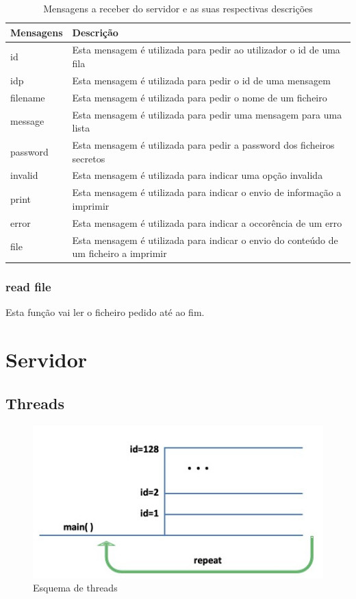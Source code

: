 \documentclass{article}
\begin{document}
\begin{table}[htbp]
\caption{\label{tab:messages}
Mensagens a receber do servidor e as suas respectivas descrições}
\centering
\begin{tabular}{ll}
\hline
Mensagens & Descrição\\
\hline
id & Esta mensagem é utilizada para pedir ao utilizador o id de uma fila\\
idp & Esta mensagem é utilizada para pedir o id de uma mensagem\\
filename & Esta mensagem é utilizada para pedir o nome de um ficheiro\\
message & Esta mensagem é utilizada para pedir uma mensagem para uma lista\\
password & Esta mensagem é utilizada para pedir a password dos ficheiros secretos\\
invalid & Esta mensagem é utilizada para indicar uma opção invalida\\
print & Esta mensagem é utilizada para indicar o envio de informação a imprimir\\
error & Esta mensagem é utilizada para indicar a occorência de um erro\\
file & Esta mensagem é utilizada para indicar o envio do conteúdo de um ficheiro a imprimir\\
\hline
\end{tabular}
\end{table}

\subsubsection{read file \cite{Chapter10}}
\label{sec:org1ad2619}

Esta função vai ler o ficheiro pedido até ao fim.

\pagebreak{}
\section{Servidor}
\label{sec:orgb856bcf}

\subsection{Threads \cite{Chapter9}}
\label{sec:orgf777310}

\begin{figure}[htbp]
\centering
\includegraphics[width=.9\linewidth]{./img/threads.jpeg}
\caption{\label{fig:threads}
Esquema de threads}
\end{figure}
\end{document}

